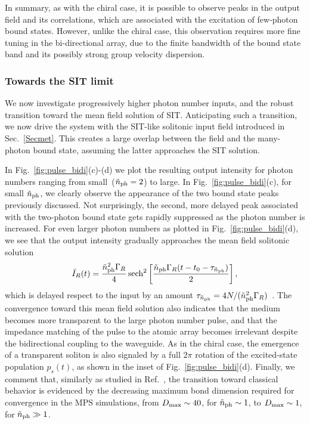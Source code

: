 \documentclass[pra,twocolumn,showpacs,preprintnumbers,amsmath,amssymb]{revtex4-1}
\begin{document}
In summary, as with the chiral case, it is possible to observe peaks in the output field and its correlations, which are associated with the excitation of few-photon bound states. However, unlike the chiral case, this observation requires more fine tuning in the bi-directional array, due to the finite bandwidth of the bound state band and its possibly strong group velocity dispersion.


\subsubsection{Towards the SIT limit}
We now investigate progressively higher photon number inputs, and the robust transition toward the mean field solution of SIT. Anticipating such a transition, we now drive the system with the SIT-like solitonic input field introduced in Sec.~\ref{Secmet}. This creates a large overlap between the field and the many-photon bound state, assuming the latter approaches the SIT solution. 

In Fig.~\ref{fig:pulse_bidi}(c)-(d) we plot the resulting output intensity for photon numbers ranging from small~($\tilde{n}_{\rm ph}=2$) to large. In  Fig.~\ref{fig:pulse_bidi}(c), for small $\tilde{n}_{\rm ph}$, we clearly observe the appearance of the two bound state peaks previously discussed. Not surprisingly, the second, more delayed peak associated with the two-photon bound state gets rapidly suppressed as the photon number is increased. For even larger photon numbers as plotted in Fig.~\ref{fig:pulse_bidi}(d), we see that the output intensity gradually approaches the mean field solitonic solution
\begin{equation}
\bar I_R(t)=\frac{\tilde n^2_{\rm ph}\Gamma_R}{4}\operatorname{sech}^2\left[\frac{\tilde n_{\rm ph}\Gamma_R(t-t_0-\tau_{\tilde n_{\rm ph}})}{2}\right],
\end{equation}
which is delayed respect to the input by an amount  $\tau_{\tilde n_{\rm ph}}=4N/(\tilde n^2_{\rm ph}\Gamma_R)$~\cite{mahmo_calajo}. The convergence toward this mean field solution also indicates that the medium becomes more transparent to the large photon number pulse, and that the impedance matching of the pulse to the atomic array becomes irrelevant despite the bidirectional coupling to the waveguide. 
As in the chiral case, the emergence of a transparent soliton is 
also signaled by  a full $2\pi$ rotation of the excited-state population $p_s(t)$, as shown in the inset of Fig.~\ref{fig:pulse_bidi}(d).
Finally, we comment that, similarly as  studied in Ref.~\cite{mahmo_calajo}, the transition toward classical behavior is evidenced by the decreasing maximum bond dimension required for convergence in the MPS simulations, from $D_{\rm max}\sim 40$, for $\tilde n_{\rm ph}\sim1$, to $D_{\rm max}\sim 1$, for $\tilde n_{\rm ph}\gg1$. %
\end{document}
